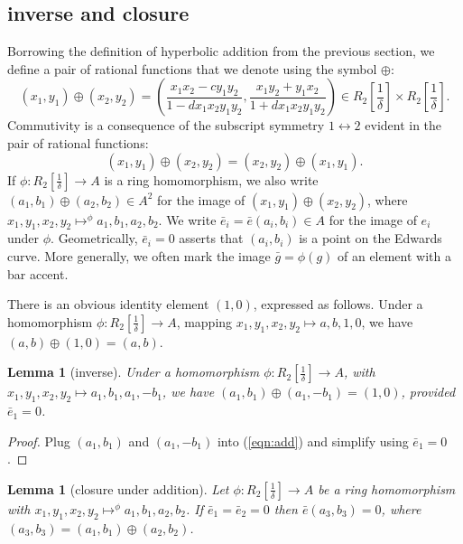 \documentclass[18pt]{article}
\newtheorem{lemma}[theorem]{Lemma}
\newcommand{\f}[1]{\frac{1}{#1}}
\begin{document}
\subsection{inverse and closure}

Borrowing the definition of hyperbolic addition from the previous section,
we define a pair of rational functions that we denote using the symbol $\oplus$:
\begin{equation}\label{eqn:add}
(x_1,y_1) \oplus (x_2,y_2) =  \left(\frac{x_1 x_2 - c y_1 y_2}{1 - d x_1 x_2 y_1 y_2},\frac{x_1 y_2 + y_1 x_2}{1+d x_1 x_2 y_1 y_2}\right) \in R_2[\f{\delta}]\times R_2[\f{\delta}].
\end{equation}
Commutivity is a consequence of the subscript symmetry $1\leftrightarrow 2$ evident in the pair of rational functions:
\[
(x_1,y_1) \oplus (x_2,y_2) = (x_2,y_2) \oplus (x_1,y_1).
\]
If $\phi:R_2[\f{\delta}]\to A$ is a ring homomorphism, we also write $(a_1,b_1)\oplus (a_2,b_2)\in A^2$ for the image
of $(x_1,y_1)\oplus (x_2,y_2)$, where $x_1,y_1,x_2,y_2 \mapsto^\phi a_1,b_1,a_2,b_2$.  We write $\bar e_i=\bar e(a_i,b_i)\in A$ for the
image of $e_i$ under $\phi$.  Geometrically,
$\bar e_i=0$ asserts that $(a_i,b_i)$ is a point on the Edwards curve.
More generally, we often mark the image $\bar g=\phi(g)$ of an element with a bar accent.

There is an obvious identity element $(1,0)$, expressed as follows.  Under a homomorphism
$\phi:R_2[\f{\delta}]\to A$, mapping $x_1,y_1,x_2,y_2\mapsto a,b,1,0$,
we have $(a,b)\oplus(1,0) = (a,b)$.

\begin{lemma} [inverse] 
Under a homomorphism
$\phi:R_2[\f{\delta}]\to A$, with $x_1,y_1,x_2,y_2\mapsto a_1,b_1,a_1,-b_1$,
we have $(a_1,b_1)\oplus (a_1,-b_1) = (1,0)$, provided $\bar e_1=0$. 
\end{lemma}

\begin{proof}  Plug $(a_1,b_1)$ and $(a_1,-b_1)$ into  (\ref{eqn:add})
and simplify using $\bar e_1=0$.
\end{proof}

\begin{lemma}[closure under addition]\label{lemma:closure}
Let $\phi:R_2[\f{\delta}]\to A$ be a ring homomorphism with $x_1,y_1,x_2,y_2 \mapsto^\phi a_1,b_1,a_2,b_2$.
If $\bar e_1 = \bar e_2 = 0$ then ${\bar e}(a_3,b_3) = 0$, where $(a_3,b_3) = (a_1,b_1)\oplus (a_2,b_2)$.
\end{lemma}
\end{document}
